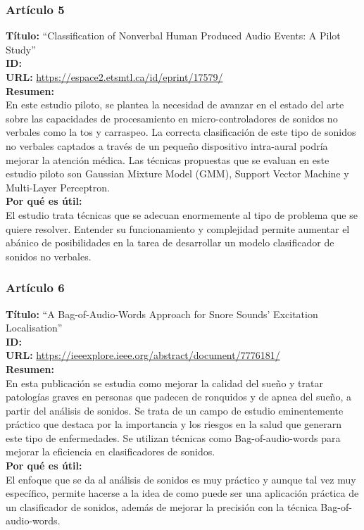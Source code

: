 \subsubsection*{Artículo 5}
    \textbf{Título:}
    “Classification of Nonverbal Human Produced Audio Events: A Pilot Study”
    \\
    \textbf{ID: \cite{bouserhal2018classification}}
    \\
    \textbf{URL:}
    \url{https://espace2.etsmtl.ca/id/eprint/17579/}
    \\
    \textbf{Resumen:\\}
    En este estudio piloto, se plantea la necesidad de avanzar en el estado del arte sobre las capacidades de procesamiento en micro-controladores de sonidos no verbales como la tos y carraspeo. La correcta clasificación de este tipo de sonidos no verbales captados a través de un pequeño dispositivo intra-aural podría mejorar la atención médica. Las técnicas propuestas que se evaluan en este estudio piloto son Gaussian Mixture Model (GMM), Support Vector Machine y Multi-Layer Perceptron.
    \\
    \textbf{Por qué es útil:\\}
    El estudio trata técnicas que se adecuan enormemente al tipo de problema que se quiere resolver. Entender su funcionamiento y complejidad permite aumentar el abánico de posibilidades en la tarea de desarrollar un modelo clasificador de sonidos no verbales.
\subsubsection*{Artículo 6}
    \textbf{Título:}
    “A Bag-of-Audio-Words Approach for Snore Sounds' Excitation Localisation”
    \\
    \textbf{ID: \cite{schmitt2016bag}}
    \\
    \textbf{URL:}
    \url{https://ieeexplore.ieee.org/abstract/document/7776181/}
    \\
    \textbf{Resumen:\\}
    En esta publicación se estudia como mejorar la calidad del sueño y tratar patologías graves en personas que padecen de ronquidos y de apnea del sueño, a partir del análisis de sonidos. Se trata de un campo de estudio eminentemente práctico que destaca por la importancia y los riesgos en la salud que generarn este tipo de enfermedades. Se utilizan técnicas como Bag-of-audio-words para mejorar la eficiencia en clasificadores de sonidos.
    \\
    \textbf{Por qué es útil:\\}
    El enfoque que se da al análisis de sonidos es muy práctico y aunque tal vez muy específico, permite hacerse a la idea de como puede ser una aplicación práctica de un clasificador de sonidos, además de mejorar la precisión con la técnica Bag-of-audio-words.
